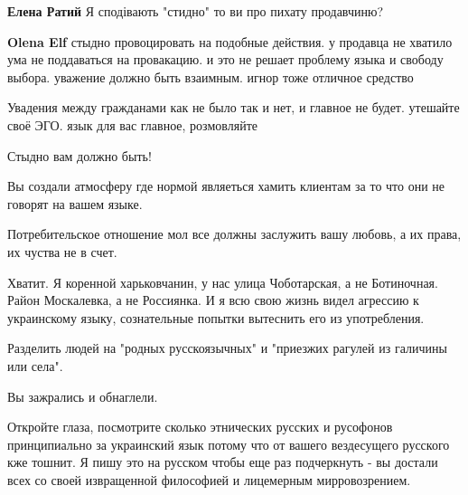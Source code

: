 \begin{itemize}
\begin{itemize}
\textbf{Елена Ратий} Я сподівають "стидно" то ви про пихату продавчиню?

 
\textbf{Olena Elf} стыдно провоцировать на подобные действия. у продавца не
хватило ума не поддаваться на провакацию. и это не решает проблему языка и
свободу выбора. уважение должно быть взаимным. игнор тоже отличное средство

 
Увадения между гражданами как не было так и нет, и главное не будет. утешайте своё ЭГО. язык для вас главное, розмовляйте

 

Стыдно вам должно быть!

Вы создали атмосферу где нормой являеться хамить клиентам за то что они не
говорят на вашем языке.

Потребительское отношение мол все должны заслужить вашу любовь, а их права, их
чуства не в счет.

Хватит. Я коренной харьковчанин, у нас улица Чоботарская, а не Ботиночная.
Район Москалевка, а не Россиянка. И я всю свою жизнь видел агрессию к
украинскому языку, сознательные попытки вытеснить его из употребления.

Разделить людей на "родных русскоязычных" и "приезжих рагулей из галичины или
села".

Вы зажрались и обнаглели.

Откройте глаза, посмотрите сколько этнических русских и русофонов принципиально
за украинский язык потому что от вашего вездесущего русского кже тошнит. Я пишу
это на русском чтобы еще раз подчеркнуть - вы достали всех со своей извращенной
философией и лицемерным мирровозрением.

 

\end{itemize}
\end{itemize}
